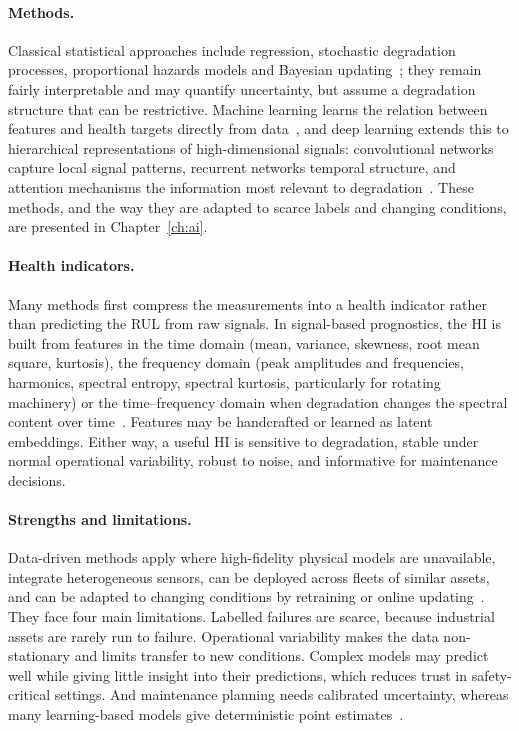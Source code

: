 \documentclass{book}
\begin{document}
\paragraph{Methods.}
Classical statistical approaches include regression, stochastic degradation
processes, proportional hazards models and Bayesian
updating~\cite{VerhagenDeBoer2018,KalbfleischPrentice1980}; they remain fairly
interpretable and may quantify uncertainty, but assume a degradation structure
that can be restrictive. Machine learning learns the relation between features
and health targets directly from data~\cite{Lei2018,Carvalho2019}, and deep
learning extends this to hierarchical representations of high-dimensional
signals: convolutional networks capture local signal patterns, recurrent
networks temporal structure, and attention mechanisms the information most
relevant to degradation~\cite{Elsherif2025}. These methods, and the way they are adapted to scarce labels and changing conditions, are presented in Chapter~\ref{ch:ai}.

\paragraph{Health indicators.}
Many methods first compress the measurements into a health indicator rather
than predicting the RUL from raw signals. In signal-based prognostics, the HI
is built from features in the time domain (mean, variance, skewness, root mean
square, kurtosis), the frequency domain (peak amplitudes and frequencies,
harmonics, spectral entropy, spectral kurtosis, particularly for rotating
machinery) or the time--frequency domain when degradation changes the spectral
content over time~\cite{MathWorksPdMebook}. Features may be handcrafted or
learned as latent embeddings. Either way, a useful HI is sensitive to
degradation, stable under normal operational variability, robust to noise,
and informative for maintenance decisions.

\paragraph{Strengths and limitations.}
Data-driven methods apply where high-fidelity physical models are unavailable,
integrate heterogeneous sensors, can be deployed across fleets of similar
assets, and can be adapted to changing conditions by retraining or online
updating~\cite{Lei2018,Carvalho2019}. They face four main limitations. Labelled
failures are scarce, because industrial assets are rarely run to failure.
Operational variability makes the data non-stationary and limits transfer to
new conditions. Complex models may predict well while giving little insight
into their predictions, which reduces trust in safety-critical settings. And
maintenance planning needs calibrated uncertainty, whereas many learning-based
models give deterministic point estimates~\cite{Si2011RUL,Lei2018}.
\end{document}
